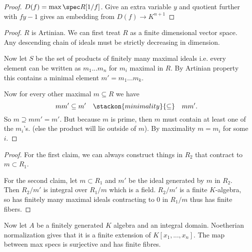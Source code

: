 \begin{proof}
    $D(f)=\max\spec R[1/f]$. Give an extra variable $y$ and quotient further with $fy-1$ gives an embedding from $D(f)\to K^{n+1}$
\end{proof}

\begin{proof}
    $R$ is Artinian. We can first treat $R$ as a finite dimensional vector space. Any descending chain of ideals must be strictly decreasing in dimension. 

    Now let $S$ be the set of products of finitely many maximal ideals i.e. every element can be written as $m_1...m_n$ for $m_i$ maximal in $R$. By Artinian property this contains a minimal element $m'=m_1...m_k$. 

    Now for every other maximal $m\subseteq R$ we have \[
    mm'\subseteq m' \quad \stackon{minimality}{\subseteq} \quad mm'.
    \]
    So $m\supseteq mm'=m'$. But because $m$ is prime, then $m$ must contain at least one of the $m_i$'s. (else the product will lie outside of $m$). By maximality $m=m_i$ for some $i$.
\end{proof}
\begin{proof}
    For the first claim, we can always construct things in $R_2$ that contract to $m\subset R_1$.

    For the second claim, let $m\subset R_1$ and $m'$ be the ideal generated by $m$ in $R_2$. Then $R_2/m'$ is integral over $R_1/m$ which is a field. $R_2/m'$ is a finite $K$-algebra, so has finitely many maximal ideals contracting to $0$ in $R_1/m$ thus has finite fibers.
\end{proof}
Now let $A$ be a finitely generated $K$ algebra and an integral domain. Noetherian normalization gives that it is a finite extension of $K[x_1,...,x_n]$. The map between max specs is surjective and has finite fibres.


